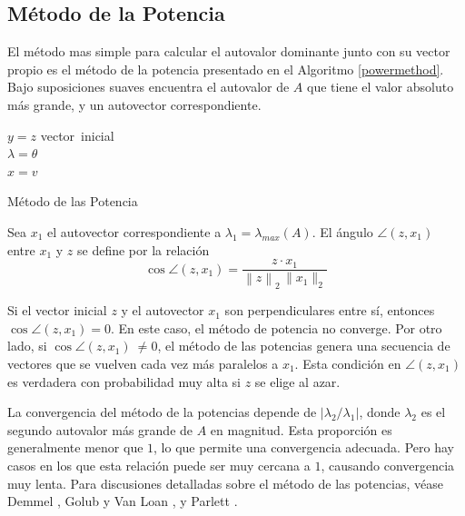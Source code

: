 \documentclass[a4paper,openright,12pt, oneside]{book}
\DeclarePairedDelimiter\norm{\lVert}{\rVert}
\providecommand{\abs}[1]{\lvert#1\rvert}
\begin{document}
\subsection{M\'etodo de la Potencia}
El m\'etodo mas simple para calcular el autovalor dominante junto con su vector propio es el m\'etodo de la potencia presentado en el Algoritmo \ref{powermethod}. Bajo suposiciones suaves encuentra el autovalor de $ A $ que tiene el valor absoluto m\'as grande, y un autovector correspondiente.

\begin{algorithm}
    \label{powermethod}
    ${y} = z$ vector\ inicial\\

    \Do{$\norm{y - \theta v}_2 \le \epsilon \abs{\theta}$}{
        $v = y/\norm{y}_2$\\
        $y = A * v$\\
        $\theta = v \cdot y$\\
    }
    $\lambda=\theta $\\
    $x=v$

    \caption{M\'etodo de las Potencia}
\end{algorithm}

Sea $ x_1 $ el autovector correspondiente a $ \lambda_1 = \lambda_{max} (A) $. El \'angulo $ \angle (z, x_1) $ entre $ x_1 $ y $ z $ se define por la relaci\'on
 \begin{displaymath}
\cos \angle(z,x_1)= \frac{z \cdot x_1}
                            {\left\|z\right\|_2 \, \|x_1\|_2}
\end{displaymath}

Si el vector inicial $ z $ y el autovector $ x_1 $ son perpendiculares entre s\'i, entonces $ \cos \angle (z, x_1) = 0 $. En este caso, el m\'etodo de potencia no converge. Por otro lado, si $ \cos \angle (z, x_1) \ \neq 0 $, el m\'etodo de las potencias genera una secuencia de vectores que se vuelven cada vez m\'as paralelos a $ x_1 $. Esta condici\'on en $ \angle(z, x_1) $ es verdadera con probabilidad muy alta si $ z $ se elige al azar.

La convergencia del m\'etodo de la potencias depende de $ \vert \lambda_2 / \lambda_1 \vert $, donde $ \lambda_2 $ es el segundo autovalor m\'as grande de $ A $ en magnitud. Esta proporci\'on es generalmente menor que $ 1 $, lo que permite una convergencia adecuada. Pero hay casos en los que esta relaci\'on puede ser muy cercana a $ 1 $, causando convergencia muy lenta. Para discusiones detalladas sobre el m\'etodo de las potencias, v\'ease Demmel \cite{Demmel}, Golub y Van Loan \cite{Householder}, y Parlett \cite{Parlett}.
\end{document}
